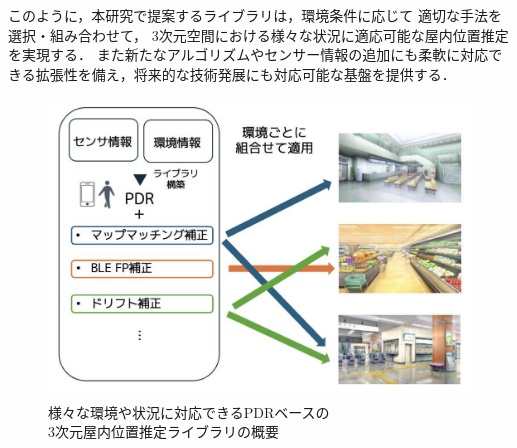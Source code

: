 このように，本研究で提案するライブラリは，環境条件に応じて
適切な手法を選択・組み合わせて，
3次元空間における様々な状況に適応可能な屋内位置推定を実現する．
また新たなアルゴリズムやセンサー情報の追加にも柔軟に対応できる拡張性を備え，将来的な技術発展にも対応可能な基盤を提供する．


\begin{figure}[h]
	\centering
	\includegraphics[width=\linewidth]{../image/first.pdf}
	\caption{様々な環境や状況に対応できるPDRベースの\\3次元屋内位置推定ライブラリの概要}    \label{fig:overview}
\end{figure}
